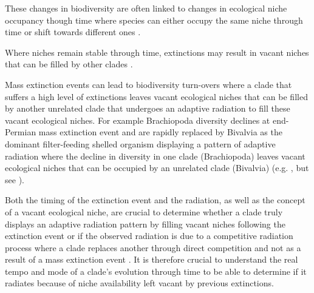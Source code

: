 \documentclass[12pt,letterpaper]{article}
\begin{document}
These changes in biodiversity are often linked to changes in ecological niche occupancy though time where species can either occupy the same niche through time or shift towards different ones \citep{Pearman2008149}. 

Where niches remain stable through time, extinctions may result in vacant niches that can be filled by other clades \citep{Pearman2008149}. 

Mass extinction events can lead to biodiversity turn-overs where a clade that suffers a high level of extinctions leaves vacant ecological niches that can be filled by another unrelated clade that undergoes an adaptive radiation to fill these vacant ecological niches. For example Brachiopoda diversity declines at end-Permian mass extinction event and are rapidly replaced by Bivalvia as the dominant filter-feeding shelled organism displaying a pattern of adaptive radiation where the decline in diversity in one clade (Brachiopoda) leaves vacant ecological niches that can be occupied by an unrelated clade (Bivalvia) (e.g. \citealt{Sepkiski1981}, \citealt{CLAPHAM01102006} but see \citealt{Payne22052014}).


Both the timing of the extinction event and the radiation, as well as the concept 
of a vacant ecological niche, are crucial to determine whether a clade truly displays an adaptive radiation pattern by filling vacant niches following the extinction event or if the observed radiation is due to a competitive radiation process where a clade replaces another through direct competition and not as a result of a mass extinction event \citep[e.g.][]{Brusatte12092008,bentonmodels2014}. It is therefore crucial to understand the real tempo and mode of a clade's evolution through time to be able to determine if it radiates because of niche availability left vacant by previous extinctions.

\end{document}
